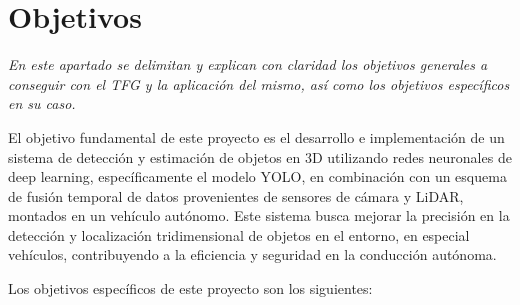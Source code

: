 \section{Objetivos}
\label{sec:objetivos-y-campo}

\textit{En este apartado se delimitan y explican con claridad los objetivos
	generales a conseguir con el TFG y la aplicación del mismo, así como los
	objetivos específicos en su caso.}

El objetivo fundamental de este proyecto es el desarrollo e implementación de un sistema de detección y estimación de objetos en 3D utilizando redes neuronales de deep learning, específicamente el modelo YOLO, en combinación con un esquema de fusión temporal de datos provenientes de sensores de cámara y LiDAR, montados en un vehículo autónomo. Este sistema busca mejorar la precisión en la detección y localización tridimensional de objetos en el entorno, en especial vehículos, contribuyendo a la eficiencia y seguridad en la conducción autónoma.

Los objetivos específicos de este proyecto son los siguientes:

